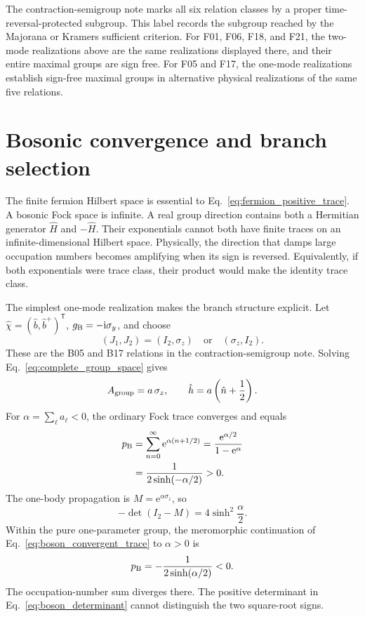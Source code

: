 \documentclass[onecolumn,aps,prb,amsmath,amssymb,superscriptaddress,longbibliography]{revtex4-2}
\newcommand{\ee}{\mathrm{e}}
\newcommand{\ii}{\mathrm{i}}
\newcommand{\trans}{\mathsf{T}}
\begin{document}
The contraction-semigroup note marks all six relation classes by a proper
time-reversal-protected subgroup.  This label records the subgroup reached by
the Majorana or Kramers sufficient criterion.  For F01, F06, F18, and F21, the
two-mode realizations above are the same realizations displayed there, and
their entire maximal groups are sign free.  For F05 and F17, the one-mode
realizations establish sign-free maximal groups in alternative physical
realizations of the same five relations.

\section{Bosonic convergence and branch selection}

The finite fermion Hilbert space is essential to
Eq.~\eqref{eq:fermion_positive_trace}.  A bosonic Fock space is infinite.  A
real group direction contains both a Hermitian generator \(\hat H\) and
\(-\hat H\).  Their exponentials cannot both have finite traces on an
infinite-dimensional Hilbert space.  Physically, the direction that damps
large occupation numbers becomes amplifying when its sign is reversed.
Equivalently, if both exponentials were trace class, their product would make
the identity trace class.

The simplest one-mode realization makes the branch structure explicit.  Let
\(\hat\chi=(\hat b,\hat b^+)^\trans\), \(g_{\rm B}=-\ii\sigma_y\), and choose
\begin{equation}
    (J_1,J_2)=(I_2,\sigma_z)
    \quad\text{or}\quad
    (\sigma_z,I_2).
    \label{eq:boson_J_pairs}
\end{equation}
These are the B05 and B17 relations in the contraction-semigroup note.
Solving Eq.~\eqref{eq:complete_group_space} gives
\begin{equation}
    A_{\rm group}=a\,\sigma_z,\qquad
    \hat h=a\left(\hat n+\frac12\right).
    \label{eq:boson_group_generator}
\end{equation}
For \(\alpha=\sum_\ell a_\ell<0\), the ordinary Fock trace converges and equals
\begin{equation}
\begin{aligned}
    p_{\rm B}
    &=\sum_{n=0}^\infty \ee^{\alpha(n+1/2)}
      =\frac{\ee^{\alpha/2}}{1-\ee^\alpha}\\
    &=\frac{1}{2\sinh(-\alpha/2)}>0 .
\end{aligned}
    \label{eq:boson_convergent_trace}
\end{equation}
The one-body propagation is \(M=\ee^{\alpha\sigma_z}\), so
\begin{equation}
    -\det(I_2-M)=4\sinh^2\frac{\alpha}{2}.
    \label{eq:boson_determinant}
\end{equation}
Within the pure one-parameter group, the meromorphic continuation of
Eq.~\eqref{eq:boson_convergent_trace} to \(\alpha>0\) is
\begin{equation}
    p_{\rm B}
    =-\frac{1}{2\sinh(\alpha/2)}<0 .
    \label{eq:boson_negative_branch}
\end{equation}
The occupation-number sum diverges there.  The positive determinant in
Eq.~\eqref{eq:boson_determinant} cannot distinguish the two square-root signs.
\end{document}
